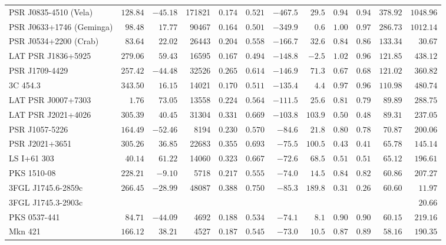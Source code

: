 \documentclass[useAMS,usenatbib]{mn2e}
\begin{document}
\begin{table}
\begin{tabular}{lrrrrrrrrrrr}
PSR J0835-4510 (Vela)     & $128.84$ & $-45.18$ & 171821 & $0.174$ & $0.521$ & $-467.5$ & $  29.5$ & $0.94$  & $0.94$ & $   378.92$ & $  1048.96$  \\ 
PSR J0633+1746 (Geminga)  & $ 98.48$ & $ 17.77$ &  90467 & $0.164$ & $0.501$ & $-349.9$ & $   0.6$ & $1.00$  & $0.97$ & $   286.73$ & $  1012.14$  \\ 
PSR J0534+2200 (Crab)     & $ 83.64$ & $ 22.02$ &  26443 & $0.204$ & $0.558$ & $-166.7$ & $  32.6$ & $0.84$  & $0.86$ & $   133.34$ & $    30.67$  \\ 
  LAT PSR J1836+5925      & $279.06$ & $ 59.43$ &  16595 & $0.167$ & $0.494$ & $-148.8$ & $  -2.5$ & $1.02$  & $0.96$ & $   121.85$ & $   438.12$  \\ 
      PSR J1709-4429      & $257.42$ & $-44.48$ &  32526 & $0.265$ & $0.614$ & $-146.9$ & $  71.3$ & $0.67$  & $0.68$ & $   121.02$ & $   360.82$  \\ 
            3C 454.3      & $343.50$ & $ 16.15$ &  14021 & $0.170$ & $0.511$ & $-135.4$ & $   4.4$ & $0.97$  & $0.96$ & $   110.98$ & $   480.74$  \\ 
  LAT PSR J0007+7303      & $  1.76$ & $ 73.05$ &  13558 & $0.224$ & $0.564$ & $-111.5$ & $  25.6$ & $0.81$  & $0.79$ & $    89.89$ & $   288.75$  \\ 
  LAT PSR J2021+4026      & $305.39$ & $ 40.45$ &  31304 & $0.331$ & $0.669$ & $-103.8$ & $ 103.9$ & $0.50$  & $0.48$ & $    89.31$ & $   237.05$  \\ 
      PSR J1057-5226      & $164.49$ & $-52.46$ &   8194 & $0.230$ & $0.570$ & $ -84.6$ & $  21.8$ & $0.80$  & $0.78$ & $    70.87$ & $   200.06$  \\ 
      PSR J2021+3651      & $305.26$ & $ 36.85$ &  22683 & $0.355$ & $0.693$ & $ -75.5$ & $ 100.5$ & $0.43$  & $0.41$ & $    65.78$ & $   145.14$  \\ 
   LS I+61 303            & $ 40.14$ & $ 61.22$ &  14060 & $0.323$ & $0.667$ & $ -72.6$ & $  68.5$ & $0.51$  & $0.51$ & $    65.12$ & $   196.61$  \\ 
   PKS 1510-08            & $228.21$ & $ -9.10$ &   5718 & $0.217$ & $0.555$ & $ -74.0$ & $  14.5$ & $0.84$  & $0.82$ & $    60.86$ & $   207.27$  \\ 
   3FGL J1745.6-2859c     & $266.45$ & $-28.99$ &  48087 & $0.388$ & $0.750$ & $ -85.3$ & $ 189.8$ & $0.31$  & $0.26$ & $    60.60$ & $    11.97$  \\
   3FGL J1745.3-2903c     &          &          &        &         &         &          &          &         &        &             & $    20.66$  \\
   PKS 0537-441           & $ 84.71$ & $-44.09$ &   4692 & $0.188$ & $0.534$ & $ -74.1$ & $   8.1$ & $0.90$  & $0.90$ & $    60.15$ & $   219.16$  \\ 
   Mkn 421                & $166.12$ & $ 38.21$ &   4527 & $0.187$ & $0.545$ & $ -73.0$ & $  10.5$ & $0.87$  & $0.89$ & $    58.16$ & $   190.35$  \\ 


\end{tabular}
\end{table}
\end{document}

